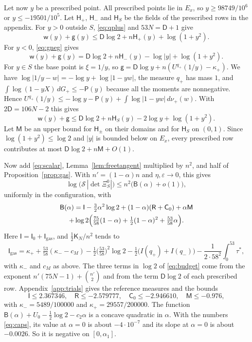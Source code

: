 \documentclass[11pt]{amsart}
\theoremstyle{definition}
\theoremstyle{remark}
\numberwithin{equation}{section}
\begin{document}
Let now $y$ be a prescribed point. All prescribed points lie in $E_x$, so $y\ge98749/10^6$ or $y\le-19501/10^5$. Let $\mathsf H_+$, $\mathsf H_-$ and $\mathsf H_S$ be the fields of the prescribed rows in
the appendix. For $y>0$ outside $S$, \eqref{eq:qplus} and $53N=\mathsf D+1$ give
\[
 \mathsf w(y)+\mathsf g(y)\le \mathsf D\log2+n\mathsf H_+(y)+\log(1+y^2).
\]
For $y<0$, \eqref{eq:gneg} gives
\[
 \mathsf w(y)+\mathsf g(y)=\mathsf D\log2+n\mathsf H_-(y)-\log|y|+\log(1+y^2).
\]
For $y\in S$ the base point is $\xi=1/y$, so $\mathsf g=\mathsf D\log y+n(U^{q_+}(1/y)-\kappa_+)$. We have $\log|1/y-w|=-\log y+\log|1-yw|$, the measure $q_+$ has mass $1$, and $\int\log(1-yX)\,dG_+\le-\mathsf P(y)$
because all the moments are nonnegative. Hence $U^{q_+}(1/y)\le-\log y-\mathsf P(y)+\int\log|1-yw|\,d\nu_+(w)$. With $2\mathsf D=106N-2$ this gives
\[
 \mathsf w(y)+\mathsf g\le \mathsf D\log2+n\mathsf H_S(y)-2\log y+\log(1+y^2).
\]
Let $\mathsf M$ be an upper bound for $\mathsf H_\pm$ on their domains and for $\mathsf H_S$ on $(0,1)$. Since $\log(1+y^2)\le\log2$ and $|y|$ is bounded below on $E_x$, every prescribed row contributes at most
$\mathsf D\log2+n\mathsf M+O(1)$.

Now add \eqref{eq:scalar}, Lemma~\ref{lem:freetangent} multiplied by $n^2$, and half of Proposition~\ref{prop:gas}. With $n'=(1-\alpha)n$ and $\eta,\varepsilon\to0$, this gives
\[
 \log\bigl(\mathcal S\,|\det\Xi^0_S|\bigr)\le n^2\bigl(\mathsf B(\alpha)+o(1)\bigr),
\]
uniformly in the configuration, with
\begin{multline}\label{eq:budget}
 \mathsf B(\alpha)=\mathsf I-\tfrac32\alpha^2\log2+(1-\alpha)(\mathsf R+\mathsf C_0)+\alpha\mathsf M\\
 +\log2\Bigl(\tfrac{75}{58}(1-\alpha)+\tfrac12(1-\alpha)^2+\tfrac{53}{58}\alpha\Bigr).
\end{multline}
Here $\mathsf I=\mathsf I_0+\mathsf I_{\mathrm{gas}}$, and $\frac12\mathsf K_N/n^2$ tends to
\[
 \mathsf I_{\mathrm{gas}}=\kappa_++\tfrac{53}{58}(\kappa_--c_M)-\tfrac12\bigl(\tfrac{53}{58}\bigr)^2\log2-\tfrac12\bigl(I(q_+)+I(q_-)\bigr)-\frac1{2\cdot58^2}\int_0^{53}\tau^*,
\]
with $\kappa_-$ and $c_M$ as above. The three terms in $\log2$ of \eqref{eq:budget} come from the exponent
$n'(75N-1)+\binom{n'}2$ and from the term $\mathsf D\log2$ of each prescribed row. Appendix~\ref{app:trials} gives the reference measures and the bounds
\begin{equation}\label{eq:caps}
 \mathsf I\le2.367346,\quad\mathsf R\le-2.579777,\quad\mathsf C_0\le-2.946610,\quad\mathsf M\le-0.976,
\end{equation}
with $\kappa_-=5489/100000$ and $\kappa_+=29557/200000$. The function $\mathsf B(\alpha)+U_0-\frac12\log2-c_2\alpha$ is a concave quadratic in $\alpha$. With the numbers
\eqref{eq:caps}, its value at $\alpha=0$ is about $-4\cdot10^{-7}$ and its slope at $\alpha=0$ is about $-0.0026$. So it
is negative on $[0,\alpha_1]$.
\end{document}
